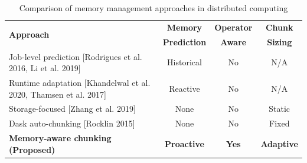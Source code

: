 \begin{table}[htb]
    \centering
    \caption{Comparison of memory management approaches in distributed computing}
    \label{tab:comparison}
    \begin{tabular}{p{7.5cm}ccc}
        \toprule
        \multirow{2}{*}{\textbf{Approach}} & \textbf{Memory} & \textbf{Operator} & \textbf{Chunk} \\
        & \textbf{Prediction} & \textbf{Aware} & \textbf{Sizing} \\
        \midrule
        Job-level prediction \newline
        \small{[Rodrigues et al. 2016, Li et al. 2019]} & Historical & No & N/A \\
        \addlinespace
        Runtime adaptation \newline
        \small{[Khandelwal et al. 2020, Thamsen et al. 2017]} & Reactive & No & N/A \\
        \addlinespace
        Storage-focused [Zhang et al. 2019] & None & No & Static \\
        \addlinespace
        Dask auto-chunking [Rocklin 2015] & None & No & Fixed \\
        \addlinespace
        \textbf{Memory-aware chunking (Proposed)} & \textbf{Proactive} & \textbf{Yes} & \textbf{Adaptive} \\
        \bottomrule
    \end{tabular}
\end{table}